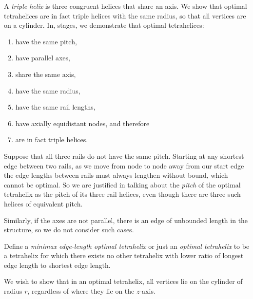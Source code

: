 \documentclass[review]{siamonline1116}
\begin{document}
A \emph{triple helix} is three congruent helices that share an axis. We show that
optimal tetrahelices are in fact triple helices with the same radius, so that all
vertices are on a cylinder. In, stages, we demonstrate that optimal tetrahelices:
\begin{enumerate}
\item have the same pitch,
\item have parallel axes,
\item share the same axis,
\item have the same radius,
  \item have the same rail lengths,
  \item have axially equidistant nodes, and therefore
  \item are in fact triple helices.
\end{enumerate}

Suppose that all three rails do not have the same pitch. Starting at any shortest edge between
two rails, as we move
from node to node away from our start edge the edge lengths
between rails must always lengthen without bound,
which cannot be optimal.
So we are justified in talking about the
\emph{pitch} of 
the optimal tetrahelix as the pitch of its three rail helices, even though there are
three such helices of equivalent pitch.

Similarly, if the axes are not parallel, there is an edge of
unbounded length in the structure, so we do not consider such cases.

Define a \emph{minimax edge-length optimal tetrahelix} or just an
\emph{optimal tetrahelix} to be a tetrahelix for which there exists
no other tetrahelix with lower ratio of longest edge length to shortest edge length.

We wish to show that in an optimal tetrahelix, all vertices lie on the cylinder
of radius $r$, regardless of where they lie on the $z$-axis.

\end{document}
